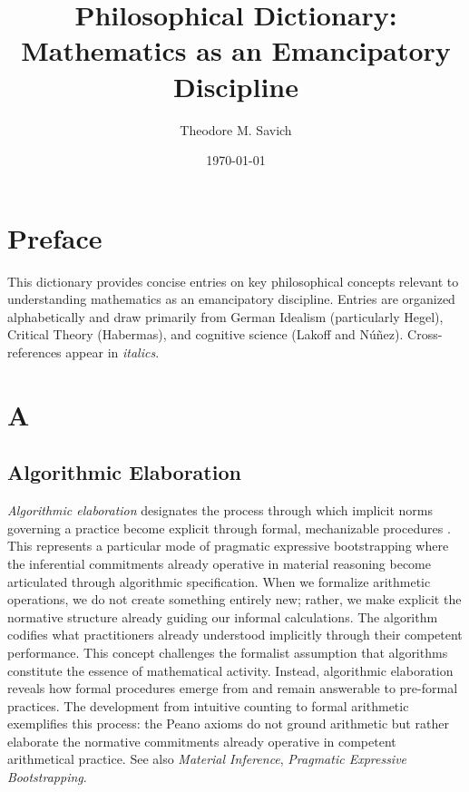 \documentclass{book}
\title{Philosophical Dictionary: Mathematics as an Emancipatory Discipline}
\author{Theodore M. Savich}
\date{\today}
\begin{document}
\maketitle
\tableofcontents
\newpage

\chapter*{Preface}

This dictionary provides concise entries on key philosophical concepts relevant to understanding mathematics as an emancipatory discipline. Entries are organized alphabetically and draw primarily from German Idealism (particularly Hegel), Critical Theory (Habermas), and cognitive science (Lakoff and Núñez). Cross-references appear in \textit{italics}.

\chapter{A}

\section{Algorithmic Elaboration}

\textit{Algorithmic elaboration} designates the process through which implicit norms governing a practice become explicit through formal, mechanizable procedures \parencite{Brandom:2019aa}. This represents a particular mode of pragmatic expressive bootstrapping where the inferential commitments already operative in material reasoning become articulated through algorithmic specification. When we formalize arithmetic operations, we do not create something entirely new; rather, we make explicit the normative structure already guiding our informal calculations. The algorithm codifies what practitioners already understood implicitly through their competent performance. This concept challenges the formalist assumption that algorithms constitute the essence of mathematical activity. Instead, algorithmic elaboration reveals how formal procedures emerge from and remain answerable to pre-formal practices. The development from intuitive counting to formal arithmetic exemplifies this process: the Peano axioms do not ground arithmetic but rather elaborate the normative commitments already operative in competent arithmetical practice. See also \textit{Material Inference}, \textit{Pragmatic Expressive Bootstrapping}.
\end{document}
